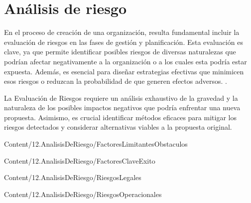 \section{Análisis de riesgo}

En el proceso de creación de una organización, resulta fundamental incluir la evaluación de riesgos en las fases de gestión y planificación. Esta evaluación es clave, ya que permite identificar posibles riesgos de diversas naturalezas que podrían afectar negativamente a la organización o a los cuales esta podría estar expuesta. Además, es esencial para diseñar estrategias efectivas que minimicen esos riesgos o reduzcan la probabilidad de que generen efectos adversos. \cite{PMI}.

La Evaluación de Riesgos requiere un análisis exhaustivo de la gravedad y la naturaleza de los posibles impactos negativos que podría enfrentar una nueva propuesta. Asimismo, es crucial identificar métodos eficaces para mitigar los riesgos detectados y considerar alternativas viables a la propuesta original.

{Content/12.AnalisisDeRiesgo/FactoresLimitantesObstaculos}

{Content/12.AnalisisDeRiesgo/FactoresClaveExito}

{Content/12.AnalisisDeRiesgo/RiesgosLegales}

{Content/12.AnalisisDeRiesgo/RiesgosOperacionales}
